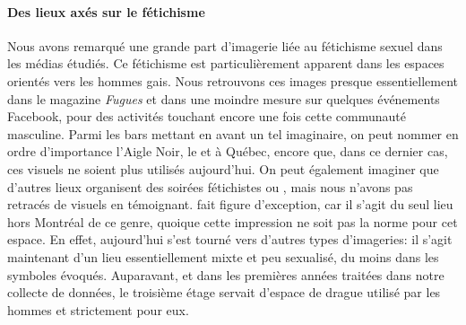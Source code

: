 \paragraph{Des lieux axés sur le fétichisme}
Nous avons remarqué une grande part d'imagerie liée au fétichisme sexuel dans les médias étudiés.
Ce fétichisme est particulièrement apparent dans les espaces orientés vers les hommes gais.
Nous retrouvons ces images presque essentiellement dans le magazine \emph{Fugues} et dans une moindre mesure sur quelques événements Facebook, pour des activités touchant encore une fois cette communauté masculine.
Parmi les bars mettant en avant un tel imaginaire, on peut nommer en ordre d'importance l'Aigle Noir, le  et  à Québec, encore que, dans ce dernier cas, ces visuels ne soient plus utilisés aujourd'hui.
On peut également imaginer que d'autres lieux organisent des soirées fétichistes ou \bdsm{}, mais nous n'avons pas retracés de visuels en témoignant.
 fait figure d'exception, car il s'agit du seul lieu hors Montréal de ce genre, quoique cette impression ne soit pas la norme pour cet espace.
En effet, aujourd'hui  s'est tourné vers d'autres types d'imageries: il s'agit maintenant d'un lieu essentiellement mixte et peu sexualisé, du moins dans les symboles évoqués.
Auparavant, et dans les premières années traitées dans notre collecte de données, le troisième étage servait d'espace de drague utilisé par les hommes et strictement pour eux.

